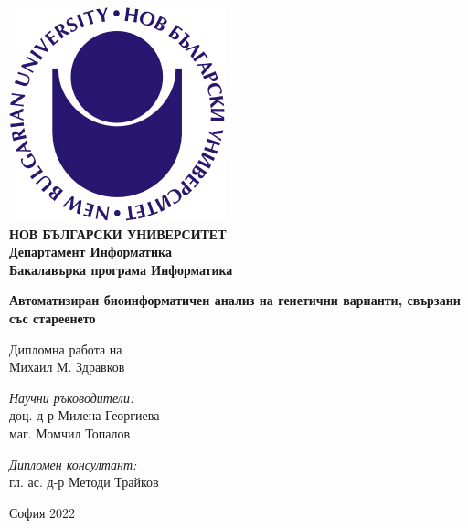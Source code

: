 \documentclass[pdftex,cyrillic,14pt,a4page,twoside,openright]{extreport}
\begin{document}
\begin{titlepage}
	\begin{center}
	\includegraphics[scale=1.2]{./NBU_logo.jpg}\\[0.3cm]
    \textbf{\Large НОВ БЪЛГАРСКИ УНИВЕРСИТЕТ\\[0.4cm]}
    \textbf{\Large Департамент Информатика\\[0.4cm]}
    \textbf{\Large Бакалавърка програма Информатика\\[3cm]}
   
		\textbf{\LARGE Автоматизиран биоинформатичен анализ на генетични варианти, свързани със стареенето\\[2cm]}
		\begin{Large}
		Дипломна работа на\\[0.2cm]
		Михаил М. Здравков\\[3cm]
		\end{Large}
		\begin{minipage}{0.48\textwidth}
			\begin{flushleft} \large
				\emph{Научни ръководители:} \\
				доц. д-р Милена Георгиева \\
				маг. Момчил Топалов
			\end{flushleft}
		\end{minipage}
			\begin{minipage}{0.48\textwidth}
			\begin{flushright} \large
				\emph{Дипломен консултант:} \\
				гл. ас. д-р Методи Трайков\\
				\clearpage
			\end{flushright}
		\end{minipage}

		\vfill

		{\large София 2022}

	\end{center}
\end{titlepage}
\end{document}
